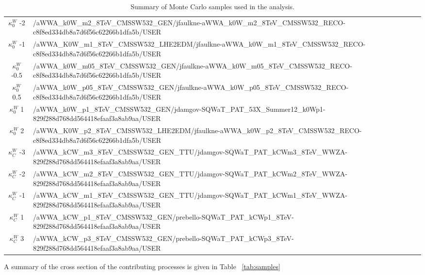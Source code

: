 \begin{sidewaystable}[htb]
\begin{center}
{\begin{tabular}{|c|l|}
      \hline
      $\kappa_{0}^{W}$ -2& /aWWA\_k0W\_m2\_8TeV\_CMSSW532\_GEN/jfaulkne-aWWA\_k0W\_m2\_8TeV\_CMSSW532\_RECO-c8f8ed334db8a7d6f56c62266b1dfa5b/USER  \\
      $\kappa_{0}^{W}$ -1& /aWWA\_K0W\_m1\_8TeV\_CMSSW532\_LHE2EDM/jfaulkne-aWWA\_k0W\_m1\_8TeV\_CMSSW532\_RECO-c8f8ed334db8a7d6f56c62266b1dfa5b/USER   \\
      $\kappa_{0}^{W}$ -0.5& /aWWA\_k0W\_m05\_8TeV\_CMSSW532\_GEN/jfaulkne-aWWA\_k0W\_m05\_8TeV\_CMSSW532\_RECO-c8f8ed334db8a7d6f56c62266b1dfa5b/USER    \\
      $\kappa_{0}^{W}$ 0.5& /aWWA\_k0W\_p05\_8TeV\_CMSSW532\_GEN/jfaulkne-aWWA\_k0W\_p05\_8TeV\_CMSSW532\_RECO-c8f8ed334db8a7d6f56c62266b1dfa5b/USER   \\
      $\kappa_{0}^{W}$ 1& /aWWA\_k0W\_p1\_8TeV\_CMSSW532\_GEN/jdamgov-SQWaT\_PAT\_53X\_Summer12\_k0Wp1-829f288d768dd564418efaaf3a8ab9aa/USER  \\
      $\kappa_{0}^{W}$ 2& /aWWA\_K0W\_p2\_8TeV\_CMSSW532\_LHE2EDM/jfaulkne-aWWA\_k0W\_p2\_8TeV\_CMSSW532\_RECO-c8f8ed334db8a7d6f56c62266b1dfa5b/USER   \\
      \hline
      $\kappa_{C}^{W}$ -3& /aWWA\_kCW\_m3\_8TeV\_CMSSW532\_GEN\_TTU/jdamgov-SQWaT\_PAT\_kCWm3\_8TeV\_WWZA-829f288d768dd564418efaaf3a8ab9aa/USER \\
      $\kappa_{C}^{W}$ -2& /aWWA\_kCW\_m2\_8TeV\_CMSSW532\_GEN\_TTU/jdamgov-SQWaT\_PAT\_kCWm2\_8TeV\_WWZA-829f288d768dd564418efaaf3a8ab9aa/USER \\
      $\kappa_{C}^{W}$ -1& /aWWA\_kCW\_m1\_8TeV\_CMSSW532\_GEN\_TTU/jdamgov-SQWaT\_PAT\_kCWm1\_8TeV\_WWZA-829f288d768dd564418efaaf3a8ab9aa/USER \\
      $\kappa_{C}^{W}$ 1& /aWWA\_kCW\_p1\_8TeV\_CMSSW532\_GEN/prebello-SQWaT\_PAT\_kCWp1\_8TeV-829f288d768dd564418efaaf3a8ab9aa/USER \\
      $\kappa_{C}^{W}$ 3& /aWWA\_kCW\_p3\_8TeV\_CMSSW532\_GEN/prebello-SQWaT\_PAT\_kCWp3\_8TeV-829f288d768dd564418efaaf3a8ab9aa/USER \\
      \hline
    \end{tabular}
  }
  \end{center}
  \caption{Summary of Monte Carlo samples used in the analysis.}
  \label{tab:MCsamples}
\end{sidewaystable}

A summary of the cross section of the contributing processes is given in Table ~\ref{tab:samples}

